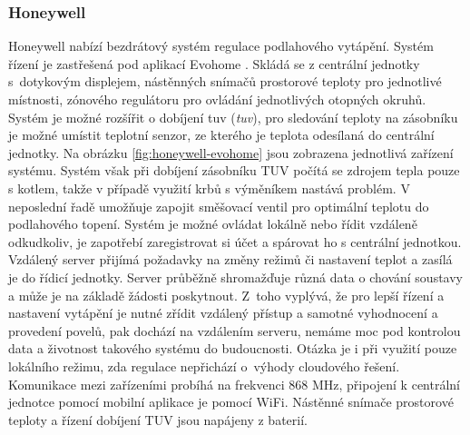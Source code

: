 \subsubsection{Honeywell}
Honeywell nabízí bezdrátový systém regulace podlahového vytápění. Systém řízení je zastřešená pod aplikací Evohome \cite{honeywell-evohome-stranky}. Skládá se z centrální jednotky s~dotykovým displejem, nástěnných snímačů prostorové teploty pro jednotlivé místnosti, zónového regulátoru pro ovládání jednotlivých otopných okruhů. Systém je možné rozšířit o dobíjení \acrshort{tuv} (\textit{\acrlong{tuv}}), pro sledování teploty na zásobníku je možné umístit teplotní senzor, ze kterého je teplota odesílaná do centrální jednotky. Na obrázku \ref{fig:honeywell-evohome} jsou zobrazena jednotlivá zařízení systému. Systém však při dobíjení zásobníku TUV počítá se zdrojem tepla pouze s kotlem, takže v případě využití krbů s výměníkem nastává problém. V neposlední řadě umožňuje zapojit směšovací ventil pro optimální teplotu do podlahového topení. Systém je možné ovládat lokálně nebo řídit vzdáleně odkudkoliv, je zapotřebí zaregistrovat si účet a spárovat ho s  centrální jednotkou. Vzdálený server přijímá požadavky na změny režimů či nastavení teplot a zasílá je do řídicí jednotky. Server průběžně shromažďuje různá data o chování soustavy a může je na základě žádosti poskytnout. Z~toho vyplývá, že pro lepší řízení a nastavení vytápění je nutné zřídit vzdálený přístup a samotné vyhodnocení a provedení povelů, pak dochází na vzdálením serveru, nemáme moc pod kontrolou data a životnost takového systému do budoucnosti. Otázka je i při využití pouze lokálního režimu, zda regulace nepřichází o~výhody cloudového řešení. Komunikace mezi zařízeními probíhá na frekvenci 868 MHz, připojení k centrální jednotce pomocí mobilní aplikace je pomocí WiFi. Nástěnné snímače prostorové teploty a řízení dobíjení TUV jsou napájeny z baterií.



